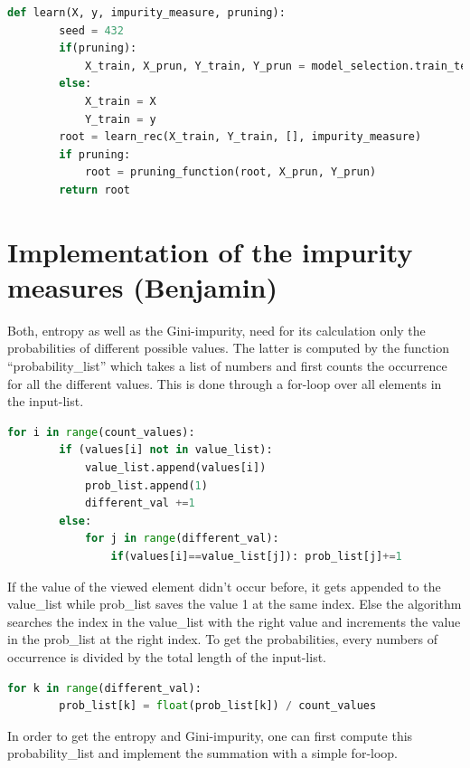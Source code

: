 \documentclass[12pt,a4paper]{scrartcl}		%
\begin{document}
\begin{lstlisting}[language=Python]
    def learn(X, y, impurity_measure, pruning):
        seed = 432
        if(pruning):
            X_train, X_prun, Y_train, Y_prun = model_selection.train_test_split(X, y, test_size= 0.3, shuffle=True,                                                                                 random_state = seed)
        else:
            X_train = X
            Y_train = y
        root = learn_rec(X_train, Y_train, [], impurity_measure)
        if pruning:
            root = pruning_function(root, X_prun, Y_prun)
        return root
\end{lstlisting}

\section{Implementation of the impurity measures (Benjamin)}
Both, entropy as well as the Gini-impurity, need for its calculation only the probabilities of different 
possible values. The latter is computed by the function “probability\_list” which takes a list of numbers 
and first counts the occurrence for all the different values. This is done through a for-loop over all 
elements in the input-list. 

\begin{lstlisting}[language=Python]
    for i in range(count_values):
        if (values[i] not in value_list): 
            value_list.append(values[i])
            prob_list.append(1)
            different_val +=1
        else:
            for j in range(different_val):
                if(values[i]==value_list[j]): prob_list[j]+=1
\end{lstlisting}
 
If the value of the viewed element didn’t occur before, it gets appended to the value\_list while prob\_list 
saves the value 1 at the same index. Else the algorithm searches the index in the value\_list with the right 
value and increments the value in the prob\_list at the right index. 
To get the probabilities, every numbers of occurrence is divided by the total length of the input-list.

\begin{lstlisting}[language=Python]
    for k in range(different_val):
        prob_list[k] = float(prob_list[k]) / count_values
\end{lstlisting}

In order to get the entropy and Gini-impurity, one can first compute this probability\_list and implement 
the summation with a simple for-loop.
\end{document}
